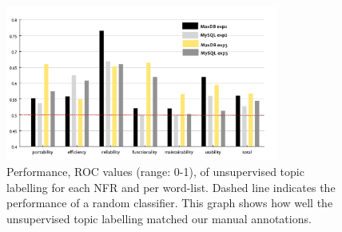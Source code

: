 \documentclass[]{sig-alternate}
\begin{document}


\begin{figure}
  \centering
 \includegraphics[width=0.8\textwidth]{figures/unsupervised-bar}
 \caption{Performance, ROC values (range: 0-1), of unsupervised topic labelling for
   each NFR and per word-list. Dashed line indicates the performance of a random classifier. This graph shows how well the
   unsupervised topic labelling matched our manual annotations.}

  \label{fig:maxdb-unsup-results}
\end{figure}

\end{document}
